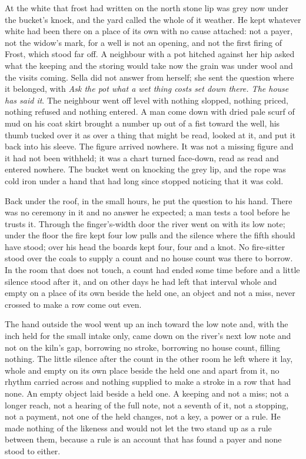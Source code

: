 At  the white that frost had written on the north stone lip was grey now under the bucket's knock, and the yard called the whole of it weather. He kept whatever white had been there on a place of its own with no cause attached: not a payer, not the widow's mark, for a well is not an opening, and not the first firing of Frost, which stood far off. A neighbour with a pot hitched against her hip asked what the keeping and the storing would take now the grain was under wool and the visits coming. Sella did not answer from herself; she sent the question where it belonged, with \emph{Ask the pot what a wet thing costs set down there. The house has said it}. The neighbour went off level with nothing slopped, nothing priced, nothing refused and nothing entered. A man come down  with dried pale scurf of mud on his coat skirt brought a number up out of a fist toward the well, his thumb tucked over it as over a thing that might be read, looked at it, and put it back into his sleeve. The figure arrived nowhere. It was not a missing figure and it had not been withheld; it was a chart turned face-down, read as read and entered nowhere. The bucket went on knocking the grey lip, and the rope was cold iron under a hand that had long since stopped noticing that it was cold.

\scenebreak

Back under the roof, in the small hours, he put the question to his hand. There was no ceremony in it and no answer he expected; a man tests a tool before he trusts it. Through the finger's-width door the river went on with its low note; under the floor the fire kept four low pulls and the silence where the fifth should have stood; over his head the boards kept four, four and a knot. No fire-sitter stood over the coals to supply a count and no house count was there to borrow. In the room that does not touch, a count had ended some time before and a little silence stood after it, and on other days he had left that interval whole and empty on a place of its own beside the held one, an object and not a miss, never crossed to make a row come out even.

The hand outside the wool went up an inch toward the low note and, with the inch held for the small intake only, came down on the river's next low note and not on the kiln's gap, borrowing no stroke, borrowing no house count, filling nothing. The little silence after the count in the other room he left where it lay, whole and empty on its own place beside the held one and apart from it, no rhythm carried across and nothing supplied to make a stroke in a row that had none. An empty object laid beside a held one. A keeping and not a miss; not a longer reach, not a hearing of the full note, not a seventh of it, not a stopping, not a payment, not one of the held changes, not a key, a power or a rule. He made nothing of the likeness and would not let the two stand up as a rule between them, because a rule is an account that has found a payer and none stood to either.

